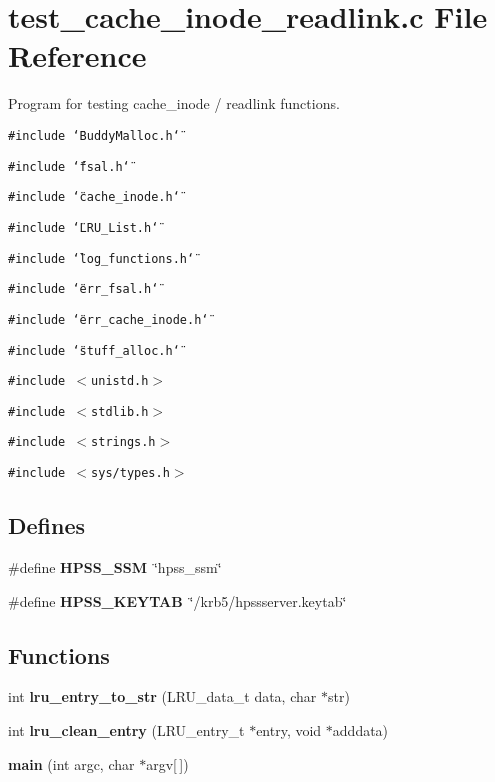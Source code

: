 \section{test\_\-cache\_\-inode\_\-readlink.c File Reference}
\label{test__cache__inode__readlink_8c}
Program for testing cache\_\-inode / readlink functions.  


{\tt \#include \char`\"{}BuddyMalloc.h\char`\"{}}\par
{\tt \#include \char`\"{}fsal.h\char`\"{}}\par
{\tt \#include \char`\"{}cache\_\-inode.h\char`\"{}}\par
{\tt \#include \char`\"{}LRU\_\-List.h\char`\"{}}\par
{\tt \#include \char`\"{}log\_\-functions.h\char`\"{}}\par
{\tt \#include \char`\"{}err\_\-fsal.h\char`\"{}}\par
{\tt \#include \char`\"{}err\_\-cache\_\-inode.h\char`\"{}}\par
{\tt \#include \char`\"{}stuff\_\-alloc.h\char`\"{}}\par
{\tt \#include $<$unistd.h$>$}\par
{\tt \#include $<$stdlib.h$>$}\par
{\tt \#include $<$strings.h$>$}\par
{\tt \#include $<$sys/types.h$>$}\par
\subsection*{Defines}
\begin{CompactItemize}
\item 
\#define {\bf HPSS\_\-SSM}~\char`\"{}hpss\_\-ssm\char`\"{}
\item 
\#define {\bf HPSS\_\-KEYTAB}~\char`\"{}/krb5/hpssserver.keytab\char`\"{}
\end{CompactItemize}
\subsection*{Functions}
\begin{CompactItemize}
\item 
int {\bf lru\_\-entry\_\-to\_\-str} (LRU\_\-data\_\-t data, char $\ast$str)
\item 
int {\bf lru\_\-clean\_\-entry} (LRU\_\-entry\_\-t $\ast$entry, void $\ast$adddata)
\item 
{\bf main} (int argc, char $\ast$argv[$\,$])
\end{CompactItemize}


